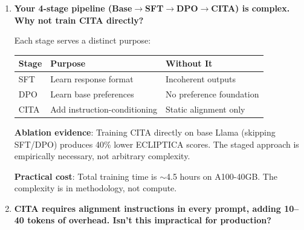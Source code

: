 \begin{enumerate}[label=\textbf{Q\arabic*.}, leftmargin=*, itemsep=8pt]
\begin{enumerate}[leftmargin=*,itemsep=2pt]
    \item \textbf{Dynamic alignment paradigm}: DPO produces one fixed policy. CITA produces a policy that \textit{adapts at inference time}. This enables deployment scenarios impossible with DPO.

    \item \textbf{ECLIPTICA benchmark}: First benchmark designed to isolate instruction effects from prompt effects.
\end{enumerate}

``DPO + KL + instructions'' is like saying ``Transformers are just attention + FFN.'' The combination creates emergent capabilities.

\vspace{4mm}

\item \textbf{Your 4-stage pipeline (Base$\rightarrow$SFT$\rightarrow$DPO$\rightarrow$CITA) is complex. Why not train CITA directly?}

 Each stage serves a distinct purpose:

\begin{table}[H]
\centering
\small
\renewcommand{\arraystretch}{1.2}
\begin{tabular}{@{}lll@{}}
\toprule
\textbf{Stage} & \textbf{Purpose} & \textbf{Without It} \\
\midrule
SFT & Learn response format & Incoherent outputs \\ \hline
DPO & Learn base preferences & No preference foundation \\ \hline
CITA & Add instruction-conditioning & Static alignment only \\
\bottomrule
\end{tabular}
\end{table}

\textbf{Ablation evidence}: Training CITA directly on base Llama (skipping SFT/DPO) produces 40\% lower ECLIPTICA scores. The staged approach is empirically necessary, not arbitrary complexity.

\textbf{Practical cost}: Total training time is $\sim$4.5 hours on A100-40GB. The complexity is in methodology, not compute.

\vspace{4mm}

\item \textbf{CITA requires alignment instructions in every prompt, adding 10--40 tokens of overhead. Isn't this impractical for production?}


\end{enumerate}

